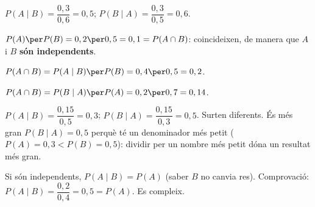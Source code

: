 \begin{solucions}
\begin{sollist}
  \item $P(A\mid B)=\dfrac{0,3}{0,6}=0,5$; $P(B\mid A)=\dfrac{0,3}{0,5}=0,6$.
  \item $P(A)\per P(B)=0,2\per 0,5=0,1=P(A\cap B)$: coincideixen, de manera que $A$ i
        $B$ \textbf{són independents}.
  \item $P(A\cap B)=P(A\mid B)\per P(B)=0,4\per 0,5=0,2$.
  \item $P(A\cap B)=P(B\mid A)\per P(A)=0,2\per 0,7=0,14$.
  \item $P(A\mid B)=\dfrac{0,15}{0,5}=0,3$; $P(B\mid A)=\dfrac{0,15}{0,3}=0,5$. Surten
        diferents. És més gran $P(B\mid A)=0,5$ perquè té un denominador més petit
        ($P(A)=0,3<P(B)=0,5$): dividir per un nombre més petit dóna un resultat més gran.
  \item Si són independents, $P(A\mid B)=P(A)$ (saber $B$ no canvia res). Comprovació:
        $P(A\mid B)=\dfrac{0,2}{0,4}=0,5=P(A)$. Es compleix.
\end{sollist}
\end{solucions}
